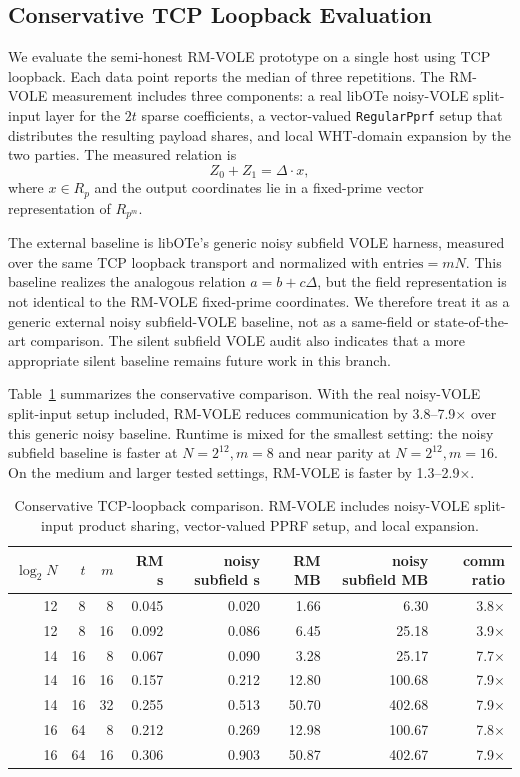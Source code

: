 
\subsection{Conservative TCP Loopback Evaluation}

We evaluate the semi-honest RM-VOLE prototype on a single host using TCP loopback.  Each data point reports the median of three repetitions.  The RM-VOLE measurement includes three components: a real libOTe noisy-VOLE split-input layer for the $2t$ sparse coefficients, a vector-valued \texttt{RegularPprf} setup that distributes the resulting payload shares, and local WHT-domain expansion by the two parties.  The measured relation is
\[
  Z_0 + Z_1 = \Delta \cdot x,
\]
where $x \in R_p$ and the output coordinates lie in a fixed-prime vector representation of $R_{p^m}$.

The external baseline is libOTe's generic noisy subfield VOLE harness, measured over the same TCP loopback transport and normalized with \(\mathrm{entries}=mN\).  This baseline realizes the analogous relation $a=b+c\Delta$, but the field representation is not identical to the RM-VOLE fixed-prime coordinates.  We therefore treat it as a generic external noisy subfield-VOLE baseline, not as a same-field or state-of-the-art comparison.  The silent subfield VOLE audit also indicates that a more appropriate silent baseline remains future work in this branch.

Table~\ref{tab:rmvole-main-conservative} summarizes the conservative comparison.  With the real noisy-VOLE split-input setup included, RM-VOLE reduces communication by 3.8--7.9$\times$ over this generic noisy baseline.  Runtime is mixed for the smallest setting: the noisy subfield baseline is faster at $N=2^{12},m=8$ and near parity at $N=2^{12},m=16$.  On the medium and larger tested settings, RM-VOLE is faster by 1.3--2.9$\times$.

\begin{table}[t]
\centering
\caption{Conservative TCP-loopback comparison.  RM-VOLE includes noisy-VOLE split-input product sharing, vector-valued PPRF setup, and local expansion.}
\label{tab:rmvole-main-conservative}
\begin{tabular}{rrrrrrrr}
\toprule
$\log_2 N$ & $t$ & $m$ & RM s & noisy subfield s & RM MB & noisy subfield MB & comm ratio \\
\midrule
12 & 8 & 8 & 0.045 & 0.020 & 1.66 & 6.30 & 3.8$\times$ \\
12 & 8 & 16 & 0.092 & 0.086 & 6.45 & 25.18 & 3.9$\times$ \\
14 & 16 & 8 & 0.067 & 0.090 & 3.28 & 25.17 & 7.7$\times$ \\
14 & 16 & 16 & 0.157 & 0.212 & 12.80 & 100.68 & 7.9$\times$ \\
14 & 16 & 32 & 0.255 & 0.513 & 50.70 & 402.68 & 7.9$\times$ \\
16 & 64 & 8 & 0.212 & 0.269 & 12.98 & 100.67 & 7.8$\times$ \\
16 & 64 & 16 & 0.306 & 0.903 & 50.87 & 402.67 & 7.9$\times$ \\
\bottomrule
\end{tabular}
\end{table}

